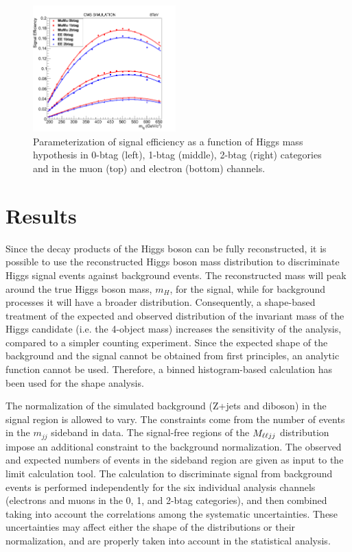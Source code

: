 \begin{figure}[htbp]
\begin{center}
\includegraphics[width=0.49\textwidth]{plots/all_signal_effs.png}
\caption{
Parameterization of signal efficiency as a function of Higgs mass hypothesis in
0-btag (left), 1-btag (middle), 2-btag (right) categories and in the
muon (top) and electron (bottom) channels.
}
\label{fig:effvsmass}
\end{center}
\end{figure}


\section{Results}

Since the decay products of the Higgs boson can be fully reconstructed, it is possible to use the reconstructed Higgs boson mass distribution to discriminate Higgs signal events against background events. The reconstructed mass will peak around the true Higgs boson mass, $m_{H}$, for the signal, while for background processes it will have a broader distribution.  Consequently, a shape-based treatment of the expected and observed distribution of the invariant mass of the Higgs candidate (i.e. the 4-object mass) increases the sensitivity of the analysis, compared to a simpler counting experiment. Since the expected shape of the background and the signal cannot be obtained from first principles, an analytic function cannot be used. Therefore, a binned histogram-based calculation has been used for the shape analysis.

The normalization of the simulated background (Z+jets and diboson) in the signal region is allowed to vary.  The constraints come from the number of events in the $m_{jj}$ sideband in data. The signal-free regions of the $M_{\ell\ell jj}$ distribution impose an additional constraint to the background normalization. The observed and expected numbers of events in the sideband region are given as input to the limit calculation tool. The calculation to discriminate signal from background events is performed independently for the six individual analysis channels (electrons and muons in the 0, 1, and 2-btag categories), and then combined taking into account the correlations among the systematic uncertainties. These uncertainties may affect either the shape of the distributions or their normalization, and are properly taken into account in the statistical analysis.

